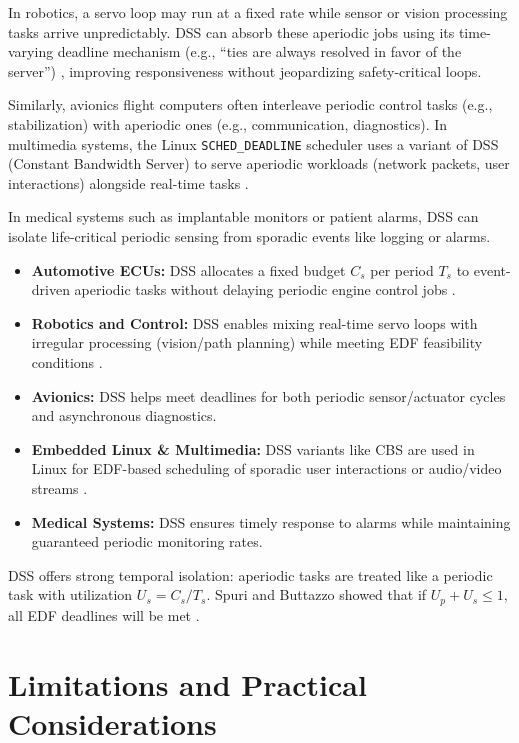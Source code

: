 \documentclass[conference]{IEEEtran}
\begin{document}
In robotics, a servo loop may run at a fixed rate while sensor or vision processing tasks arrive unpredictably. DSS can absorb these aperiodic jobs using its time-varying deadline mechanism (e.g., “ties are always resolved in favor of the server”) \cite{buttazzo2011hard, spuri1994efficient}, improving responsiveness without jeopardizing safety-critical loops.

Similarly, avionics flight computers often interleave periodic control tasks (e.g., stabilization) with aperiodic ones (e.g., communication, diagnostics). In multimedia systems, the Linux \texttt{SCHED\_DEADLINE} scheduler uses a variant of DSS (Constant Bandwidth Server) to serve aperiodic workloads (network packets, user interactions) alongside real-time tasks \cite{buttazzo2011hard, spuri1994efficient}.

In medical systems such as implantable monitors or patient alarms, DSS can isolate life-critical periodic sensing from sporadic events like logging or alarms.

\begin{itemize}
    \item \textbf{Automotive ECUs:} DSS allocates a fixed budget $C_s$ per period $T_s$ to event-driven aperiodic tasks without delaying periodic engine control jobs \cite{spuri1994efficient}.
    \item \textbf{Robotics and Control:} DSS enables mixing real-time servo loops with irregular processing (vision/path planning) while meeting EDF feasibility conditions \cite{buttazzo2011hard}.
    \item \textbf{Avionics:} DSS helps meet deadlines for both periodic sensor/actuator cycles and asynchronous diagnostics.
    \item \textbf{Embedded Linux \& Multimedia:} DSS variants like CBS are used in Linux for EDF-based scheduling of sporadic user interactions or audio/video streams \cite{buttazzo2011hard}.
    \item \textbf{Medical Systems:} DSS ensures timely response to alarms while maintaining guaranteed periodic monitoring rates.
\end{itemize}

DSS offers strong temporal isolation: aperiodic tasks are treated like a periodic task with utilization $U_s = C_s / T_s$. Spuri and Buttazzo showed that if $U_p + U_s \leq 1$, all EDF deadlines will be met \cite{spuri1994efficient, buttazzo2011hard}.

\section{Limitations and Practical Considerations}
\end{document}
